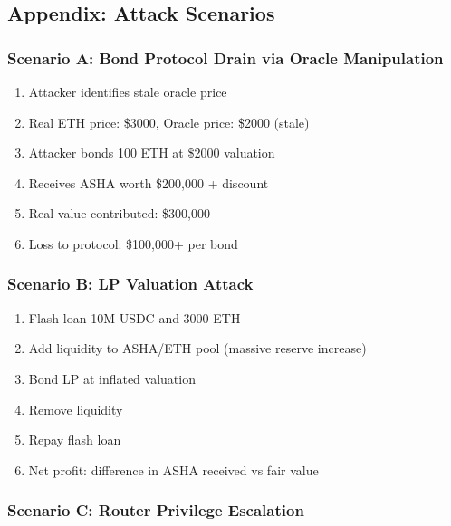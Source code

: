 \documentclass[
]{article}
\providecommand{\tightlist}{%
  \setlength{\itemsep}{0pt}\setlength{\parskip}{0pt}}
\begin{document}
\subsection{Appendix: Attack Scenarios}\label{appendix-attack-scenarios}

\subsubsection{Scenario A: Bond Protocol Drain via Oracle
Manipulation}\label{scenario-a-bond-protocol-drain-via-oracle-manipulation}

\begin{enumerate}
\def\labelenumi{\arabic{enumi}.}
\tightlist
\item
  Attacker identifies stale oracle price
\item
  Real ETH price: \$3000, Oracle price: \$2000 (stale)
\item
  Attacker bonds 100 ETH at \$2000 valuation
\item
  Receives ASHA worth \$200,000 + discount
\item
  Real value contributed: \$300,000
\item
  Loss to protocol: \$100,000+ per bond
\end{enumerate}

\subsubsection{Scenario B: LP Valuation
Attack}\label{scenario-b-lp-valuation-attack}

\begin{enumerate}
\def\labelenumi{\arabic{enumi}.}
\tightlist
\item
  Flash loan 10M USDC and 3000 ETH
\item
  Add liquidity to ASHA/ETH pool (massive reserve increase)
\item
  Bond LP at inflated valuation
\item
  Remove liquidity
\item
  Repay flash loan
\item
  Net profit: difference in ASHA received vs fair value
\end{enumerate}

\subsubsection{Scenario C: Router Privilege
Escalation}\label{scenario-c-router-privilege-escalation}
\end{document}
